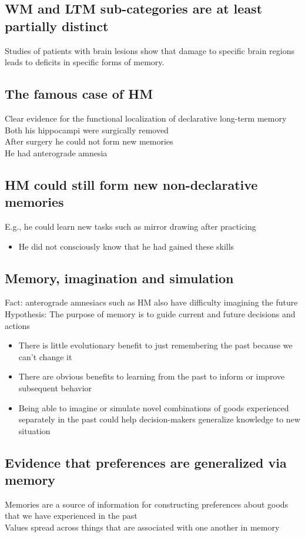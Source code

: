 \subsection{WM and LTM sub-categories are at least partially distinct}
Studies of patients with brain lesions show that damage to specific brain regions leads to deficits in specific forms of memory.
\subsection{The famous case of HM}
Clear evidence for the functional localization of declarative long-term memory
\\Both his hippocampi were surgically removed
\\After surgery he could not form new memories
\\He had anterograde amnesia

\subsection{HM could still form new non-declarative memories}
E.g., he could learn new tasks such as mirror drawing after practicing
\begin{itemize}
    \item He did not consciously know that he had gained these skills
\end{itemize}
\subsection{Memory, imagination and simulation}
Fact: anterograde amnesiacs such as HM also have difficulty imagining the future
\\Hypothesis: The purpose of memory is to guide current and future decisions and actions
\begin{itemize}
    \item There is little evolutionary benefit to just remembering the past because we can't change it
    \item There are obvious benefits to learning from the past to inform or improve subsequent behavior
    \item Being able to imagine or simulate novel combinations of goods experienced separately in the past could help decision-makers generalize knowledge to new situation
\end{itemize}
\subsection{Evidence that preferences are generalized via memory}
Memories are a source of information for constructing preferences about goods that we have experienced in the past
\\Values spread across things that are associated with one another in memory
